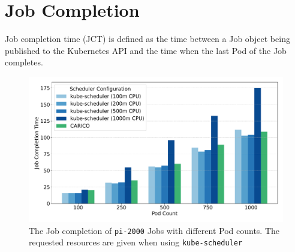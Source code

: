 \section{Job Completion}
\label{sec:eval-job-completion}
Job completion time (JCT) is defined as the time between a Job object being
published to the Kubernetes API and the time when the last Pod of the Job
completes.
%

\begin{figure}[ht!]
    \centering
    \includegraphics[width=\textwidth]{images/pi-job-completion.pdf}
    \caption{The Job completion of \texttt{pi-2000} Jobs with different Pod
    counts. The requested resources are given when using \texttt{kube-scheduler}}
    \label{fig:pi-2000-throughput}
\end{figure}

